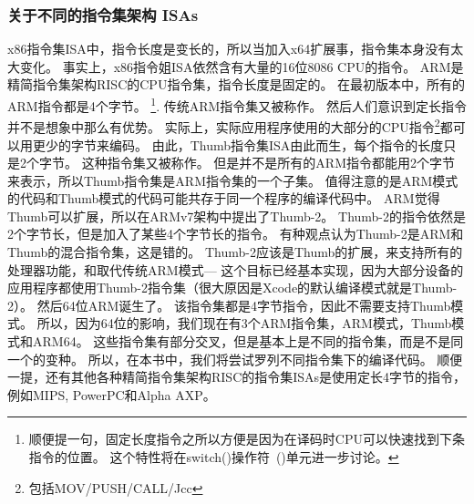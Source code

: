 \documentclass[UTF8,nofonts]{ctexart}
\begin{document}
\subsubsection{关于不同的指令集架构 \ac{ISA}s}
x86指令集\ac{ISA}中，指令长度是变长的，所以当加入x64扩展事，指令集本身没有太大变化。
事实上，x86指令姐\ac{ISA}依然含有大量的16位8086 CPU的指令。
ARM是精简指令集架构\ac{RISC}的\ac{CPU}指令集，指令长度是固定的。
在最初版本中，所有的ARM指令都是4个字节。
\footnote{
顺便提一句，固定长度指令之所以方便是因为在译码时CPU可以快速找到下条指令的位置。
这个特性将在switch()操作符~()单元进一步讨论。
}.
传统ARM指令集又被称作。
然后人们意识到定长指令并不是想象中那么有优势。
实际上，实际应用程序使用的大部分的\ac{CPU}指令\footnote{包括MOV/PUSH/CALL/Jcc}都可以用更少的字节来编码。
由此，Thumb指令集\ac{ISA}由此而生，每个指令的长度只是2个字节。
这种指令集又被称作。
但是并不是所有的ARM指令都能用2个字节来表示，所以Thumb指令集是ARM指令集的一个子集。
值得注意的是ARM模式的代码和Thumb模式的代码可能共存于同一个程序的编译代码中。
ARM觉得Thumb可以扩展，所以在ARMv7架构中提出了Thumb-2。
Thumb-2的指令依然是2个字节长，但是加入了某些4个字节长的指令。
有种观点认为Thumb-2是ARM和Thumb的混合指令集，这是错的。
Thumb-2应该是Thumb的扩展，来支持所有的处理器功能，和取代传统ARM模式---
这个目标已经基本实现，因为大部分设备的应用程序都使用Thumb-2指令集（很大原因是Xcode的默认编译模式就是Thumb-2）。
然后64位ARM诞生了。
该指令集都是4字节指令，因此不需要支持Thumb模式。
所以，因为64位的影响，我们现在有3个ARM指令集，ARM模式，Thumb模式和ARM64。
这些指令集有部分交叉，但是基本上是不同的指令集，而是不是同一个的变种。
所以，在本书中，我们将尝试罗列不同指令集下的编译代码。
%
%
%
顺便一提，还有其他各种精简指令集架构\ac{RISC}的指令集\ac{ISA}s是使用定长4字节的指令，例如MIPS, PowerPC和Alpha AXP。
\end{document}
